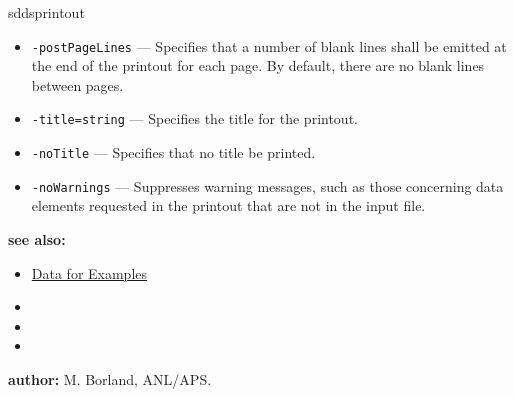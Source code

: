 \begin{sddsprog}{sddsprintout}
\begin{itemize}
      \item \verb|-postPageLines| --- Specifies that a number of blank lines shall be emitted at the end of the printout for each page. By default, there are no blank lines between pages.
      \item \verb|-title=string| --- Specifies the title for the printout.
      \item \verb|-noTitle| --- Specifies that no title be printed.
      \item \verb|-noWarnings| --- Suppresses warning messages, such as those concerning data elements requested in the printout that are not in the input file.
    \end{itemize}
  \item \textbf{see also:}
    \begin{itemize}
      \item \hyperref[exampleData]{Data for Examples}
      \item {}
      \item {}
      \item {}
    \end{itemize}
  \item \textbf{author:} M. Borland, ANL/APS.
\end{sddsprog}
